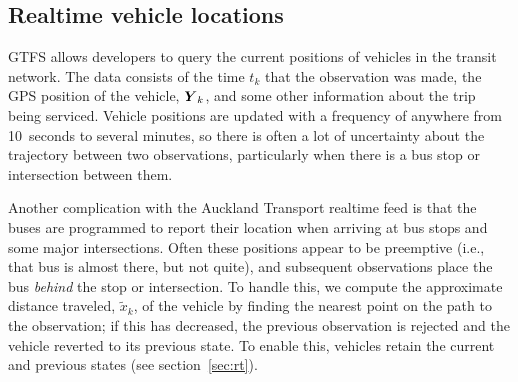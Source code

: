 \subsection{Realtime vehicle locations}
\label{sec:realtime_data}

GTFS \rt allows developers to query the current positions of vehicles
in the transit network.
The data consists of the time $t_k$ that the observation was made,
the GPS position of the vehicle, $\mbox{$\boldsymbol{Y}$}_k$, 
and some other information about the trip being serviced.
Vehicle positions are updated with a frequency of anywhere from 10~seconds to several minutes,
so there is often a lot of uncertainty about the trajectory
between two observations, particularly when there is a bus stop
or intersection between them.

Another complication with the Auckland Transport realtime feed is that
the buses are programmed to report their location when arriving at
bus stops and some major intersections.
Often these positions appear to be preemptive (i.e., that bus is almost there, 
but not quite),
and subsequent observations place the bus \emph{behind} the stop or intersection.
To handle this, we compute the approximate distance traveled, $\tilde x_k$,
of the vehicle by finding the nearest point on the path to the observation;
if this has decreased, the previous observation is rejected and the vehicle reverted
to its previous state.
To enable this, vehicles retain the current and previous states (see section~\ref{sec:rt}).
